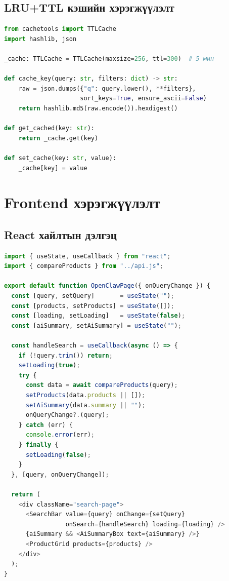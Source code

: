 \documentclass[12pt,a4paper]{report}
\begin{document}
\subsection{LRU+TTL кэшийн хэрэгжүүлэлт}

\begin{lstlisting}[language=Python, caption={Cachetools ашиглан хайлтын кэш}, label={lst:cache}]
from cachetools import TTLCache
import hashlib, json

_cache: TTLCache = TTLCache(maxsize=256, ttl=300)  # 5 мин

def cache_key(query: str, filters: dict) -> str:
    raw = json.dumps({"q": query.lower(), **filters},
                     sort_keys=True, ensure_ascii=False)
    return hashlib.md5(raw.encode()).hexdigest()

def get_cached(key: str):
    return _cache.get(key)

def set_cache(key: str, value):
    _cache[key] = value
\end{lstlisting}

\section{Frontend хэрэгжүүлэлт}

\subsection{React хайлтын дэлгэц}

\begin{lstlisting}[language=JavaScript, caption={React хайлтын дэлгэц}, label={lst:react}]
import { useState, useCallback } from "react";
import { compareProducts } from "../api.js";

export default function OpenClawPage({ onQueryChange }) {
  const [query, setQuery]       = useState("");
  const [products, setProducts] = useState([]);
  const [loading, setLoading]   = useState(false);
  const [aiSummary, setAiSummary] = useState("");

  const handleSearch = useCallback(async () => {
    if (!query.trim()) return;
    setLoading(true);
    try {
      const data = await compareProducts(query);
      setProducts(data.products || []);
      setAiSummary(data.summary || "");
      onQueryChange?.(query);
    } catch (err) {
      console.error(err);
    } finally {
      setLoading(false);
    }
  }, [query, onQueryChange]);

  return (
    <div className="search-page">
      <SearchBar value={query} onChange={setQuery}
                 onSearch={handleSearch} loading={loading} />
      {aiSummary && <AiSummaryBox text={aiSummary} />}
      <ProductGrid products={products} />
    </div>
  );
}
\end{lstlisting}
\end{document}
